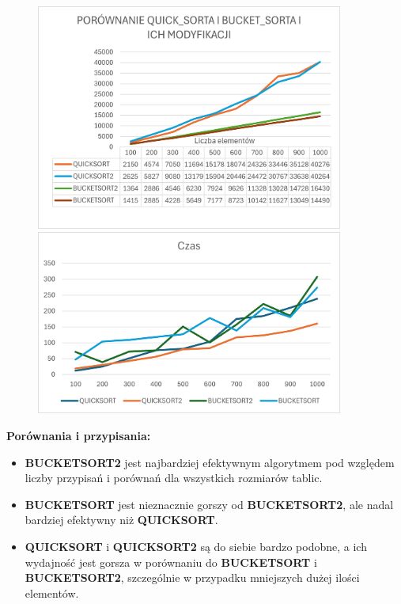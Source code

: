 \documentclass{article}
\begin{document}
			\begin{figure}[H]
				\centering
				\includegraphics[width=0.9\textwidth]{QSBS1.png}
				\includegraphics[width=0.9\textwidth]{QSBS2.png}
			\end{figure}
			
			\textbf{Porównania i przypisania:}
			\begin{itemize}
				\item \textbf{BUCKETSORT2} jest najbardziej efektywnym algorytmem pod względem liczby przypisań i porównań dla wszystkich rozmiarów tablic.
				\item \textbf{BUCKETSORT} jest nieznacznie gorszy od \textbf{BUCKETSORT2}, ale nadal bardziej efektywny niż \textbf{QUICKSORT}.
				\item \textbf{QUICKSORT} i \textbf{QUICKSORT2} są do siebie bardzo podobne, a ich wydajność jest gorsza w porównaniu do \textbf{BUCKETSORT} i \textbf{BUCKETSORT2}, szczególnie w przypadku mniejszych dużej ilości elementów.
			\end{itemize}
			
\end{document}
